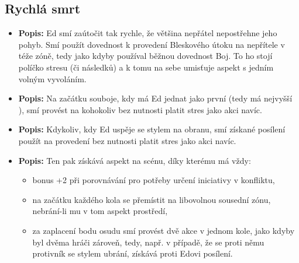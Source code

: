 \documentclass[../main.tex]{subfiles}
\begin{document}
\subsection{Rychlá smrt}
\label{sec:eden-rychla}

\begin{specialita}
\begin{itemize}
	\item \textbf{Popis:} Ed smí zaútočit tak rychle, že většina nepřátel nepostřehne jeho pohyb. Smí použít dovednost  k provedení Bleskového útoku na nepřítele v téže zóně, tedy jako kdyby používal běžnou dovednost Boj. To ho stojí políčko stresu (či následků) a k tomu na sebe umisťuje aspekt  s jedním volným vyvoláním.
\end{itemize}
\end{specialita}

\begin{specialita}
\begin{itemize}
	\item \textbf{Popis:} Na začátku souboje, kdy má Ed jednat jako první (tedy má nejvyšší ), smí provést na kohokoliv  bez nutnosti platit stres jako akci navíc.
\end{itemize}
\end{specialita}

\begin{specialita}[Protego, II]
\begin{itemize}
	\item \textbf{Popis:} Kdykoliv, kdy Ed uspěje se stylem na obranu, smí získané posílení použít na provedení  bez nutnosti platit stres jako akci navíc.
\end{itemize}
\end{specialita}

\begin{specialita}[Zawardo, IV]
\begin{itemize}
	\item \textbf{Popis:} Ten pak získává aspekt  na scénu, díky kterému má vždy:
		\begin{itemize}
			\item bonus +2 při porovnávání  pro potřeby určení iniciativy v konfliktu,
			\item na začátku každého kola se přemístit na libovolnou sousední zónu, nebrání-li mu v tom aspekt prostředí,
			\item za zaplacení bodu osudu smí provést dvě akce v jednom kole, jako kdyby byl dvěma hráči zároveň, tedy, např. v případě, že se proti němu protivník se stylem ubrání, získává proti Edovi posílení.
		\end{itemize}
\end{itemize}
\end{specialita}
\end{document}
